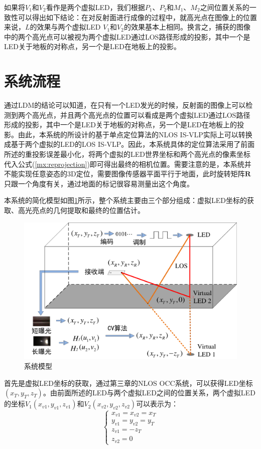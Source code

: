 如果将$V_{1}$和$V_{2}$看作是两个虚拟LED，我们根据$P_{1}$、$P_{2}$和$M_{1}$、$M_{2}$之间位置关系的一致性可以得出如下结论：在对反射面进行成像的过程中，就高光点在图像上的位置来说，$L$的效果与两个虚拟LED $V_{1}$和$V_{2}$的效果基本上相同。换言之，捕获的图像中的两个高光点可以被视为两个虚拟LED通过LOS路径形成的投影，其中一个是LED关于地板的对称点，另一个是LED在地板上的投影。




\section{系统流程}
通过LDM的结论可以知道，在只有一个LED发光的时候，反射面的图像上可以检测到两个高光点，并且两个高光点的位置可以看成是两个虚拟LED通过LOS路径形成的投影，其中一个是LED关于地板的对称点，另一个是LED在地板上的投影。由此，本系统的所设计的基于单点定位算法的NLOS IS-VLP实际上可以转换成基于两个虚拟的LED的LOS IS-VLP。因此，本系统具体的定位算法采用了前面所述的重投影误差最小化，将两个虚拟的LED世界坐标和两个高光点的像素坐标代入公式(\ref{mx:reprojection})即可得出最终的相机位置。需要注意的是，本系统并不能实现任意姿态的3D定位，需要图像传感器平面平行于地面，此时旋转矩阵$\mathbf{R}$只跟一个角度有关，通过地面的标记很容易测量出这个角度。

本系统的简化模型如图\ref{fig:firstsystemmodel}所示，整个系统主要由三个部分组成：虚拟LED坐标的获取、高光亮点的几何提取和最终的位置估计。
\begin{figure}[!t]
  \centering
  \includegraphics[width=0.7\linewidth]{FIG/First systemmodel.pdf}
  \caption{系统模型}
  \label{fig:firstsystemmodel}
\end{figure}


首先是虚拟LED坐标的获取，通过第三章的NLOS OCC系统，可以获得LED坐标$(x_T,y_T,z_T)$。由前面所述的LED与两个虚拟LED之间的位置关系，两个虚拟LED的坐标$V_1(x_{v1},y_{v1},z_{v1})$和$V_2(x_{v2},y_{v2},z_{v2})$可以表示为：
 \begin{equation}\label{v1v2}
    \begin{cases} 
              x_{v1}=x_{v2}=x_{T} \\
              y_{v1}=y_{v2}=y_{T}   \\     
              z_{v1}=-z_{T}\\
              z_{v2}=0             
    \end{cases}
\end{equation}
        
